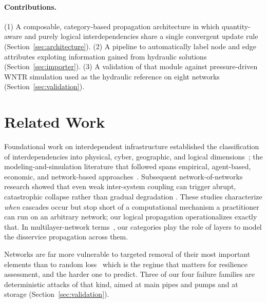 \documentclass{svproc}
\begin{document}
\paragraph{Contributions.} (1) A composable, category-based propagation
architecture in which quantity-aware and purely logical interdependencies
share a single convergent update rule (Section~\ref{sec:architecture}). 
(2) A pipeline to automatically label node and edge attributes exploting information gained from hydraulic
solutions (Section~\ref{sec:importer}). (3) A validation of that module
against pressure-driven WNTR simulation used as the hydraulic reference on eight networks (Section~\ref{sec:validation}).
\section{Related Work}\label{sec:related}

Foundational work on interdependent infrastructure established the
classification of interdependencies into physical, cyber, geographic, and
logical dimensions~\cite{rinaldi_identifying_2002}; the
modeling-and-simulation literature that followed spans empirical,
agent-based, economic, and network-based
approaches~\cite{ouyang_review_2014}. Subsequent network-of-networks
research showed that even weak inter-system coupling
can trigger abrupt, catastrophic collapse rather than gradual degradation
\cite{buldyrev_catastrophic_2010,gao_networks_2011}.
These studies characterize \emph{when} cascades occur but stop short of a
computational mechanism a practitioner can run on an arbitrary network; our
logical propagation operationalizes exactly that. In
multilayer-network terms~\cite{kivela_multilayer_2014,boccaletti_structure_2014,curaba2026seriesparalleldependencylinks},
our categories play the role of layers to model the disservice propagation across them.


Networks are far more vulnerable to targeted removal of their most important elements than
to random loss~\cite{albert_error_2000} which is the regime that matters for
resilience assessment, and the harder one to predict. Three of our four failure
families are deterministic attacks of that kind, aimed at main pipes and pumps and at storage (Section~\ref{sec:validation}).
\end{document}
